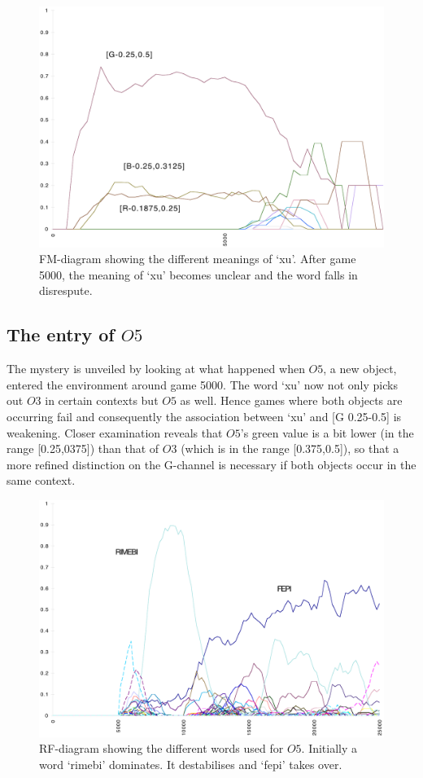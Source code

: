 \begin{figure}[htbp]
  \centerline{\includegraphics[width=.80\textwidth]{chap7/figs/FM-XU}}
\caption{ \label{FM-XU.f} FM-diagram showing the different
meanings of `xu'. After game 5000, the meaning of `xu' becomes
unclear and the word falls in disrespute.}
\end{figure}

\subsection{The entry of $O5$}

The mystery is unveiled by looking at what
happened when $O5$, a new object, entered the environment 
around game 5000. The word `xu' now not only picks out
$O3$ in certain contexts but $O5$ as well. Hence 
games where both objects are occurring fail and consequently 
the association between `xu' and [G 0.25-0.5] is 
weakening. Closer examination reveals that $O5$'s green value
is a bit lower (in the range [0.25,0375]) than that of $O3$
(which is in the range [0.375,0.5]), so that a more refined
distinction on the G-channel is necessary if both objects
occur in the same context. 


\begin{figure}[htbp]
  \centerline{\includegraphics[width=.80\textwidth]{chap7/figs/RF-O5}}
\caption{ \label{RF-O5} RF-diagram showing
the different words used for $O5$. Initially a word 
`rimebi' dominates. It destabilises and `fepi' takes over.}
\end{figure}

